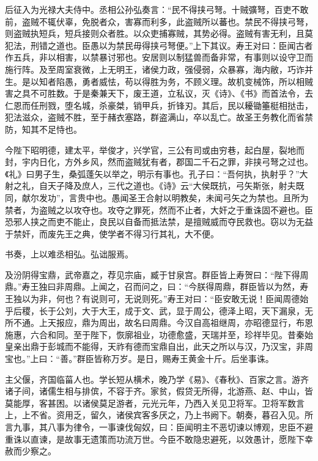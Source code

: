 \documentclass[12pt,UTF8]{ctexbook}
\begin{document}
后征入为光禄大夫侍中。丞相公孙弘奏言：“民不得挟弓弩。十贼彍弩，百吏不敢前，盗贼不辄伏辜，免脱者众，害寡而利多，此盗贼所以蕃也。禁民不得挟弓弩，则盗贼执短兵，短兵接则众者胜。以众吏捕寡贼，其势必得。盗贼有害无利，且莫犯法，刑错之道也。臣愚以为禁民毋得挟弓弩便。”上下其议。寿王对曰：臣闻古者作五兵，非以相害，以禁暴讨邪也。安居则以制猛兽而备非常，有事则以设守卫而施行阵。及至周室衰微，上无明王，诸侯力政，强侵弱，众暴寡，海内敝，巧诈并生。是以知者陷愚，勇者威怯，苟以得胜为务，不顾义理。故机变械饰，所以相贼害之具不可胜数。于是秦兼天下，废王道，立私议，灭《诗》、《书》而首法令，去仁恩而任刑戮，堕名城，杀豪桀，销甲兵，折锋刃。其后，民以耰锄箠梃相挞击，犯法滋众，盗贼不胜，至于赭衣塞路，群盗满山，卒以乱亡。故圣王务教化而省禁防，知其不足恃也。



今陛下昭明德，建太平，举俊才，兴学官，三公有司或由穷巷，起白屋，裂地而封，宇内日化，方外乡风，然而盗贼犹有者，郡国二千石之罪，非挟弓弩之过也。《礼》曰男子生，桑弧蓬矢以举之，明示有事也。孔子曰：“吾何执，执射乎？”大射之礼，自天子降及庶人，三代之道也。《诗》云“大侯既抗，弓矢斯张，射夫既同，献尔发功”，言贵中也。愚闻圣王合射以明教矣，未闻弓矢之为禁也。且所为禁者，为盗贼之以攻夺也。攻夺之罪死，然而不止者，大奸之于重诛固不避也。臣恐邪人挟之而吏不能止，良民以自备而抵法禁，是擅贼威而夺民救也。窃以为无益于禁奸，而废先王之典，使学者不得习行其礼，大不便。



书奏，上以难丞相弘。弘诎服焉。



及汾阴得宝鼎，武帝嘉之，荐见宗庙，臧于甘泉宫。群臣皆上寿贺曰：“陛下得周鼎。”寿王独曰非周鼎。上闻之，召而问之，曰：“今朕得周鼎，群臣皆以为然，寿王独以为非，何也？有说则可，无说则死。”寿王对曰：“臣安敢无说！臣闻周德始乎后稷，长于公刘，大于大王，成于文、武，显于周公，德泽上昭，天下漏泉，无所不通。上天报应，鼎为周出，故名曰周鼎。今汉自高祖继周，亦昭德显行，布恩施惠，六合和同。至于陛下，恢廓祖业，功德愈盛，天瑞并至，珍祥毕见。昔秦始皇亲出鼎于彭城而不能得，天祚有德而宝鼎自出，此天之所以与汉，乃汉宝，非周宝也。”上曰：“善。”群臣皆称万岁。是日，赐寿王黄金十斤。后坐事诛。



主父偃，齐国临菑人也。学长短从横术，晚乃学《易》、《春秋》、百家之言。游齐诸子间，诸儒生相与排傧，不容于齐。家贫，假贷无所得，北游燕、赵、中山，皆莫能厚，客甚困。以诸侯莫足游者，元光元年，乃西入关见卫将军。卫将军数言上，上不省。资用乏，留久，诸侯宾客多厌之，乃上书阙下。朝奏，暮召入见。所言九事，其八事为律令，一事谏伐匈奴，曰：臣闻明主不恶切谏以博观，忠臣不避重诛以直谏，是故事无遗策而功流万世。今臣不敢隐忠避死，以效愚计，愿陛下幸赦而少察之。
\end{document}
